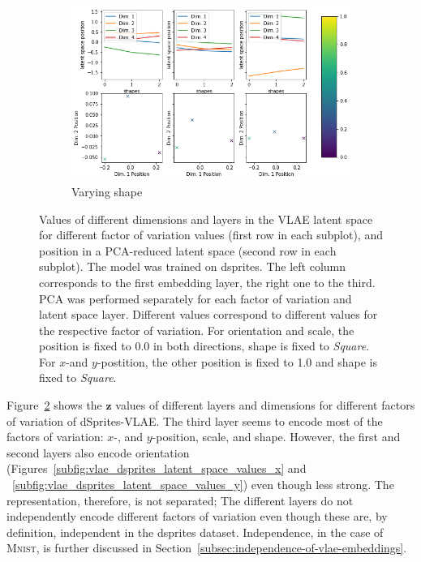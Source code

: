 \begin{figure}
\begin{subfigure}{.48\textwidth}
        \includegraphics[width=\textwidth]{images/latent_space_traversals/vlae_dsprites_shape_latent_space_values.png}
        \caption{Varying shape}
        \label{subfig:vlae_dsprites_latent_space_values_shape}
    \end{subfigure}
    \caption[VLAE on dsprites: Latent Space Values]{Values of different dimensions and layers in the VLAE latent space for different factor of variation values (first row in each subplot), and position in a \ac{PCA}-reduced latent space (second row in each subplot). The model was trained on dsprites. The left column corresponds to the first embedding layer, the right one to the third. \ac{PCA} was performed separately for each factor of variation and latent space layer. Different values correspond to different values for the respective factor of variation. For orientation and scale, the position is fixed to 0.0 in both directions, shape is fixed to \textit{Square}. For $x$-and $y$-postition, the other position is fixed to 1.0 and shape is fixed to \textit{Square}.}
    \label{fig:vlae_dsprites_latent_space_values}
\end{figure}
Figure~\ref{fig:vlae_dsprites_latent_space_values} shows the $\bm{z}$ values of different layers and dimensions for different factors of variation of dSprites-\ac{VLAE}.
The third layer seems to encode most of the factors of variation: $x$-, and $y$-position, scale, and shape.
However, the first and second layers also encode orientation (Figures~\ref{subfig:vlae_dsprites_latent_space_values_x} and ~\ref{subfig:vlae_dsprites_latent_space_values_y}) even though less strong.
The representation, therefore, is not separated;
The different layers do not independently encode different factors of variation even though these are, by definition, independent in the dsprites dataset.
Independence, in the case of \textsc{Mnist}, is further discussed in Section~\ref{subsec:independence-of-vlae-embeddings}.


